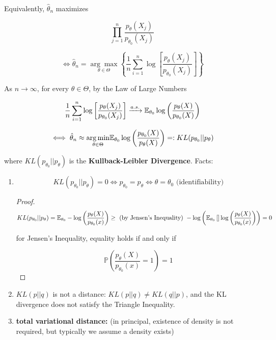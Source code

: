 \begin{remark}

Equivalently, \(\hat{\theta}_n\) maximizes

\[
\prod_{j=1}^n \frac{ p_\theta(X_j)}{p_{\theta_0}(X_j)}
\]

\[
\iff \hat{\theta}_n = \underset{\theta \in \Theta}{\arg \max} \left\{  \frac{1}{n} \sum_{i=1}^n \log  \left[  \frac{ p_\theta(X_j)}{p_{\theta_0} (X_j)} \right] \right\}
\]

As \(n \to \infty\), for every \(\theta \in \Theta\), by the Law of Large Numbers

\[
 \frac{1}{n} \sum_{i=1}^n \log  \left[  \frac{ p_\theta(X_j)}{p_{\theta_0} (X_j)} \right]  \xrightarrow{a.s.} \E_{\theta_0} \log \left(  \frac{p_\theta(X) }{ p_{\theta_0}(X)} \right)
\]

\[
\iff \hat{\theta}_n \approx  \underset{\theta \in \Theta}{\arg \min} \E_{\theta_0} \log \left(  \frac{p_{\theta_0} (X) } {p_{\theta}(X)}\right) =: KL(p_{\theta_0} || p_\theta)
\]

where \(KL(p_{\theta_0} || p_\theta)\) is the \textbf{Kullback-Leibler Divergence}. Facts:

\begin{enumerate}

\item 

\[
KL(p_{\theta_0} || p_\theta) = 0 \iff  p_{\theta_0} = p_\theta \iff \theta = \theta_0 \text{ (identifiability)}
\]

\begin{proof}

\[
KL(p_{\theta_0} || p_\theta) = \E_{\theta_0} - \log \left( \frac{ p_\theta(X)}{p_{\theta_0}(x)}  \right) \geq \text{ (by Jensen's Inequality) }  - \log \left( \E_{\theta_0} \left[ \right] \log \left( \frac{ p_\theta(X)}{p_{\theta_0}(x)}  \right) \right) = 0
\]

for Jensen's Inequality, equality holds if and only if 

\[
\mathbb{P}\left(\frac{ p_\theta(X)}{p_{\theta_0}(x)} = 1 \right) = 1
\]

\end{proof}

\item \(KL(p  || q ) \) is not a distance: \(KL(p  || q ) \neq KL(q || p)
\), and the KL divergence does not satisfy the Triangle Inequality.

\item  \textbf{total variational distance:} (in principal, existence of density is not required, but typically we assume a density exists)


\end{enumerate}
\end{remark}
